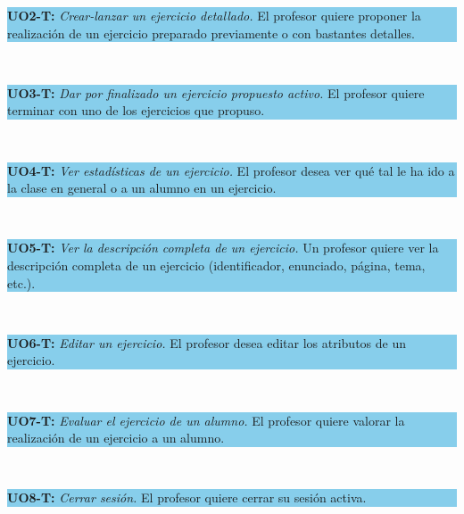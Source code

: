 \vspace{0.1cm}

\colorbox{SkyBlue}{\parbox[c]{1.0\textwidth}{
\textbf{UO2-T:} \textit{Crear-lanzar un ejercicio detallado.} El profesor quiere proponer la realización de un ejercicio preparado previamente o con bastantes detalles.\\
}}\\

\vspace{0.1cm}

\colorbox{SkyBlue}{\parbox[c]{1.0\textwidth}{
\textbf{UO3-T:} \textit{Dar por finalizado un ejercicio propuesto activo.} El profesor quiere terminar con uno de los ejercicios que propuso.\\
}}\\

\vspace{0.1cm}

\colorbox{SkyBlue}{\parbox[c]{1.0\textwidth}{
\textbf{UO4-T:} \textit{Ver estadísticas de un ejercicio.} El profesor desea ver qué tal le ha ido a la clase en general o a un alumno en un ejercicio.\\
}}\\

\vspace{0.1cm}

\colorbox{SkyBlue}{\parbox[c]{1.0\textwidth}{
\textbf{UO5-T:} \textit{Ver la descripción completa de un ejercicio.} Un profesor quiere ver la descripción completa de un ejercicio (identificador, enunciado, página, tema, etc.).\\
}}\\

\vspace{0.1cm}

\colorbox{SkyBlue}{\parbox[c]{1.0\textwidth}{
\textbf{UO6-T:} \textit{Editar un ejercicio.} El profesor desea editar los atributos de un ejercicio.\\
}}\\

\vspace{0.1cm}

\colorbox{SkyBlue}{\parbox[c]{1.0\textwidth}{
\textbf{UO7-T:} \textit{Evaluar el ejercicio de un alumno.} El profesor quiere valorar la realización de un ejercicio a un alumno.\\
}}\\

\vspace{0.1cm}

\colorbox{SkyBlue}{\parbox[c]{1.0\textwidth}{
\textbf{UO8-T:} \textit{Cerrar sesión.} El profesor quiere cerrar su sesión activa.\\
}}\\

